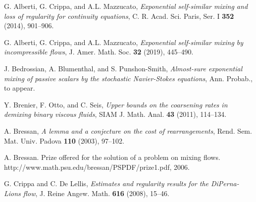 \documentclass[12pt]{article}
\numberwithin{figure}{section}
\numberwithin{equation}{section}
\begin{document}
\begin{thebibliography}{99}
G. Alberti, G. Crippa, and A.L. Mazzucato, 
{\it Exponential self-similar mixing and loss of regularity for continuity equations},
C. R. Acad. Sci. Paris, Ser. I {\bf 352} (2014), 901--906.

G. Alberti, G. Crippa, and A.L. Mazzucato,
{\it Exponential self-similar mixing by incompressible flows}, 
J. Amer. Math. Soc.  {\bf 32} (2019), 445--490.





 J. Bedrossian, A. Blumenthal, and S. Punshon-Smith, 
{\it Almost-sure exponential mixing of passive scalars by the stochastic Navier-Stokes equations},
Ann. Probab., to appear.

Y. Brenier, F. Otto, and C. Seis, 
{\it Upper bounds on the coarsening rates in demixing binary viscous fluids},
SIAM J. Math. Anal. {\bf 43} (2011), 114--134.

A. Bressan,
{\it A lemma and a conjecture on the cost of rearrangements},
Rend. Sem. Mat. Univ. Padova {\bf 110} (2003), 97--102. 

 A. Bressan. Prize offered for the solution of a problem on mixing flows. http://www.math.psu.edu/bressan/PSPDF/prize1.pdf, 2006.




G. Crippa and C. De Lellis, 
{\it Estimates and regularity results for the DiPerna-Lions flow},
J. Reine Angew. Math. {\bf 616} (2008), 15--46.


\end{thebibliography}
\end{document}
